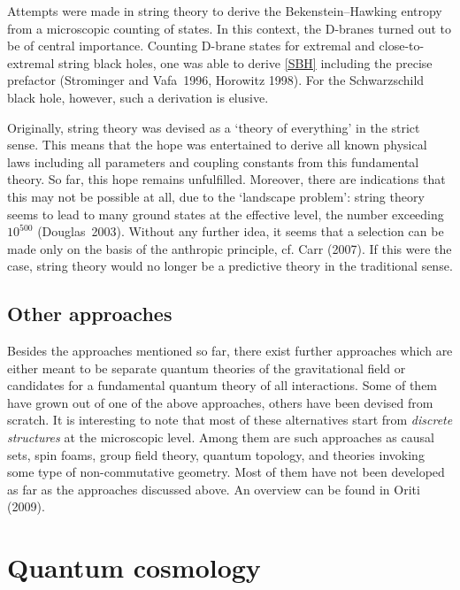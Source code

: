 \documentclass[12pt,a4paper]{article}
\begin{document}
Attempts were made in string theory to derive the Bekenstein--Hawking
entropy from a microscopic counting of states. In this context, the
D-branes turned out to be of central importance. Counting D-brane
states for extremal and close-to-extremal string black holes, one was
able to derive \eqref{SBH} including the precise prefactor
(Strominger and Vafa~1996, Horowitz 1998). For the Schwarzschild black
hole, however, such a derivation is elusive.

Originally, string theory was devised as a `theory of everything' in
the strict sense. This means that the hope was entertained to derive
all known physical laws including all parameters and coupling
constants from this fundamental theory. So far, this hope remains
unfulfilled. Moreover, there are indications that this may not be
possible at all, due to the `landscape problem': string theory
seems to lead to many ground states at the effective level, the number
exceeding $10^{500}$ (Douglas~2003). Without any further idea, it
seems that a selection can be made only on the basis of the anthropic
principle, cf. Carr (2007). If this were the case, string theory would no longer
be a predictive theory in the traditional sense. 


\subsection{Other approaches}

Besides the approaches mentioned so far, there exist further
approaches which are either meant to be separate quantum theories of
the gravitational field or candidates for a fundamental quantum theory
of all interactions. Some of them have grown out of one of the above
approaches, others have been devised from scratch. It is interesting
to note that most of these alternatives start from {\em discrete
  structures} at the microscopic level. Among them are such approaches
as causal sets, spin foams, group field theory, quantum topology, and
theories invoking some type of non-commutative geometry. Most of them
have not been developed as far as the approaches discussed above. An
overview can be found in Oriti (2009). 


\section{Quantum cosmology}
\end{document}
